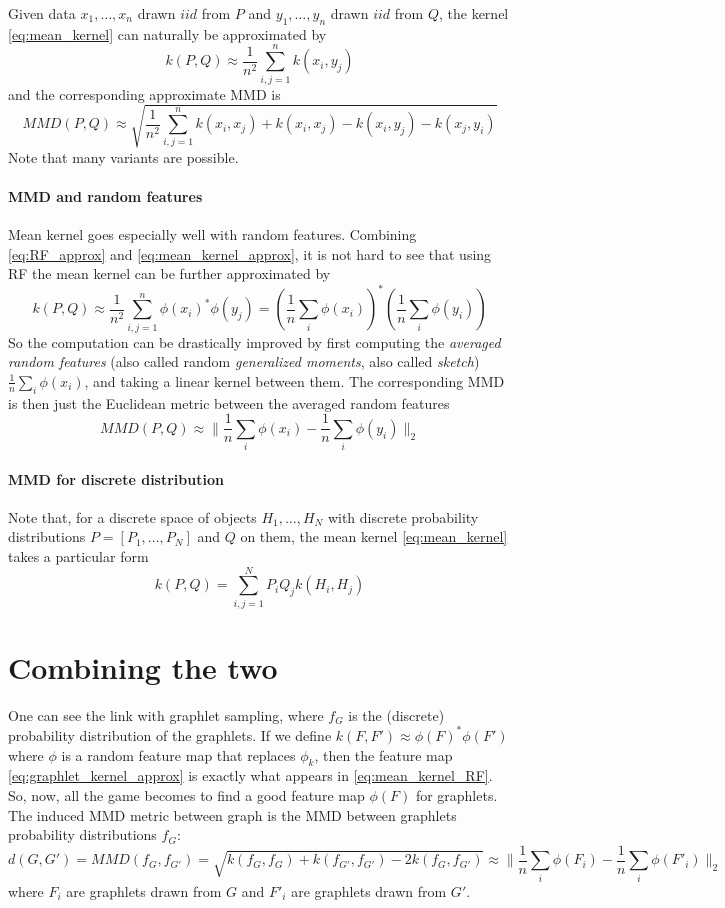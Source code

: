 \documentclass{article}
\begin{document}
Given data $x_1, \ldots, x_n$ drawn $iid$ from $P$ and $y_1, \ldots, y_n$ drawn $iid$ from $Q$, the kernel \eqref{eq:mean_kernel} can naturally be approximated by
\begin{equation}\label{eq:mean_kernel_approx}
k(P,Q) \approx \frac{1}{n^2} \sum_{i,j=1}^n k(x_i,y_j)
\end{equation}
and the corresponding approximate MMD is
\[
MMD(P,Q) \approx \sqrt{\frac{1}{n^2} \sum_{i,j=1}^n k(x_i,x_j) + k(x_i,x_j) - k(x_i,y_j) - k(x_j, y_i)}
\]
Note that many variants are possible.

\paragraph{MMD and random features} Mean kernel goes especially well with random features. Combining \eqref{eq:RF_approx} and \eqref{eq:mean_kernel_approx}, it is not hard to see that using RF the mean kernel can be further approximated by
\begin{equation}
\label{eq:mean_kernel_RF}
k(P,Q) \approx \frac{1}{n^2} \sum_{i,j=1}^n \phi(x_i)^*\phi(y_j) = \left(\frac{1}{n} \sum_i \phi(x_i)\right)^* \left(\frac{1}{n} \sum_i \phi(y_i)\right)
\end{equation}
So the computation can be drastically improved by first computing the \emph{averaged random features} (also called random \emph{generalized moments}, also called \emph{sketch}) $\frac{1}{n} \sum_i \phi(x_i)$, and taking a linear kernel between them. The corresponding MMD is then just the Euclidean metric between the averaged random features
\[
MMD(P,Q) \approx \| \frac{1}{n} \sum_i \phi(x_i) - \frac{1}{n} \sum_i \phi(y_i)\|_2
\]

\paragraph{MMD for discrete distribution} Note that, for a discrete space of objects $H_1, \ldots, H_N$ with discrete probability distributions $P = [P_1, \ldots, P_N]$ and $Q$ on them, the mean kernel \eqref{eq:mean_kernel} takes a particular form
\[
k(P,Q) = \sum_{i,j=1}^N P_i Q_j k(H_i, H_j)
\]

\section{Combining the two}

One can see the link with graphlet sampling, where $f_G$ is the (discrete) probability distribution of the graphlets. If we define $k(F, F') \approx \phi(F)^*\phi(F')$ where $\phi$ is a random feature map that replaces $\phi_k$, then the feature map \eqref{eq:graphlet_kernel_approx} is exactly what appears in \eqref{eq:mean_kernel_RF}. So, now, all the game becomes to find a good feature map $\phi(F)$ for graphlets. The induced MMD metric between graph is the MMD between graphlets probability distributions $f_G$:
\[
d(G,G') = MMD(f_G, f_{G'}) = \sqrt{k(f_G, f_{G}) + k(f_{G'}, f_{G'}) - 2 k(f_G, f_{G'})} \approx \| \frac{1}{n} \sum_i \phi(F_i) - \frac{1}{n} \sum_i \phi(F'_i)\|_2
\]
where $F_i$ are graphlets drawn from $G$ and $F'_i$ are graphlets drawn from $G'$.
\end{document}
